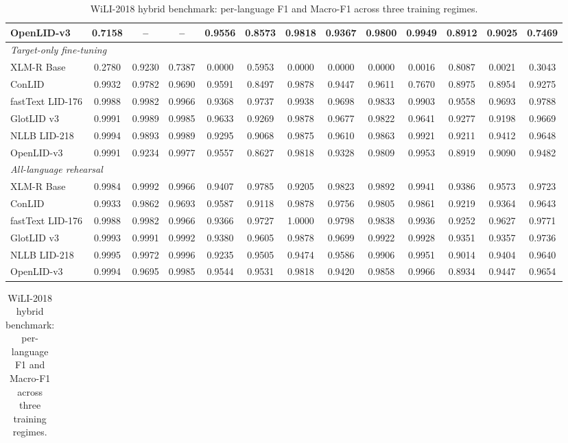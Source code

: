 \begin{table}[p]
\begin{tabular}{l ccc cccccccc c}
OpenLID-v3 & 0.7158 & -- & -- & 0.9556 & 0.8573 & 0.9818 & 0.9367 & 0.9800 & 0.9949 & 0.8912 & 0.9025 & 0.7469 \\
\midrule
\multicolumn{13}{l}{\textit{Target-only fine-tuning}} \\
XLM-R Base & 0.2780 & 0.9230 & 0.7387 & 0.0000 & 0.5953 & 0.0000 & 0.0000 & 0.0000 & 0.0016 & 0.8087 & 0.0021 & 0.3043 \\
ConLID & 0.9932 & 0.9782 & 0.9690 & 0.9591 & 0.8497 & 0.9878 & 0.9447 & 0.9611 & 0.7670 & 0.8975 & 0.8954 & 0.9275 \\
fastText LID-176 & 0.9988 & 0.9982 & 0.9966 & 0.9368 & 0.9737 & 0.9938 & 0.9698 & 0.9833 & 0.9903 & 0.9558 & 0.9693 & 0.9788 \\
GlotLID v3 & 0.9991 & 0.9989 & 0.9985 & 0.9633 & 0.9269 & 0.9878 & 0.9677 & 0.9822 & 0.9641 & 0.9277 & 0.9198 & 0.9669 \\
NLLB LID-218 & 0.9994 & 0.9893 & 0.9989 & 0.9295 & 0.9068 & 0.9875 & 0.9610 & 0.9863 & 0.9921 & 0.9211 & 0.9412 & 0.9648 \\
OpenLID-v3 & 0.9991 & 0.9234 & 0.9977 & 0.9557 & 0.8627 & 0.9818 & 0.9328 & 0.9809 & 0.9953 & 0.8919 & 0.9090 & 0.9482 \\
\midrule
\multicolumn{13}{l}{\textit{All-language rehearsal}} \\
XLM-R Base & 0.9984 & 0.9992 & 0.9966 & 0.9407 & 0.9785 & 0.9205 & 0.9823 & 0.9892 & 0.9941 & 0.9386 & 0.9573 & 0.9723 \\
ConLID & 0.9933 & 0.9862 & 0.9693 & 0.9587 & 0.9118 & 0.9878 & 0.9756 & 0.9805 & 0.9861 & 0.9219 & 0.9364 & 0.9643 \\
fastText LID-176 & 0.9988 & 0.9982 & 0.9966 & 0.9366 & 0.9727 & 1.0000 & 0.9798 & 0.9838 & 0.9936 & 0.9252 & 0.9627 & 0.9771 \\
GlotLID v3 & 0.9993 & 0.9991 & 0.9992 & 0.9380 & 0.9605 & 0.9878 & 0.9699 & 0.9922 & 0.9928 & 0.9351 & 0.9357 & 0.9736 \\
NLLB LID-218 & 0.9995 & 0.9972 & 0.9996 & 0.9235 & 0.9505 & 0.9474 & 0.9586 & 0.9906 & 0.9951 & 0.9014 & 0.9404 & 0.9640 \\
OpenLID-v3 & 0.9994 & 0.9695 & 0.9985 & 0.9544 & 0.9531 & 0.9818 & 0.9420 & 0.9858 & 0.9966 & 0.8934 & 0.9447 & 0.9654 \\
\bottomrule
\end{tabular}
\vspace{4pt}
\caption{WiLI-2018 hybrid benchmark: per-language F1 and Macro-F1 across three training regimes.}
\label{tab:wili_full}
\begin{tabular}{l ccc cccccccc c}

\end{tabular}
\end{table}
